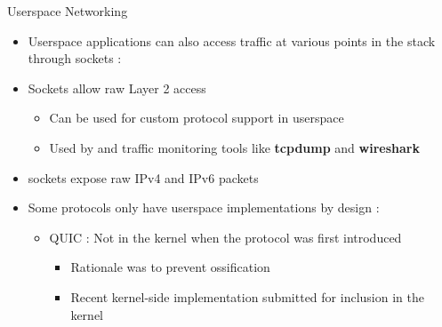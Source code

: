 \begin{frame}{Userspace Networking}
	\begin{itemize}
		\item Userspace applications can also access traffic at various points in the stack through sockets :
		\item {} Sockets allow raw Layer 2 access
			 \begin{itemize}
				 \item Can be used for custom protocol support in userspace
				 \item Used by  and traffic monitoring tools like \textbf{tcpdump} and \textbf{wireshark}
			 \end{itemize}
		 \item {} sockets expose raw IPv4 and IPv6 packets
		\item Some protocols only have userspace implementations by design :
			\begin{itemize}
				\item QUIC : Not in the kernel when the protocol was first introduced
					\begin{itemize}
						\item Rationale was to prevent ossification
						\item Recent kernel-side implementation submitted for inclusion in the kernel
					\end{itemize}
			\end{itemize}
	\end{itemize}
\end{frame}

